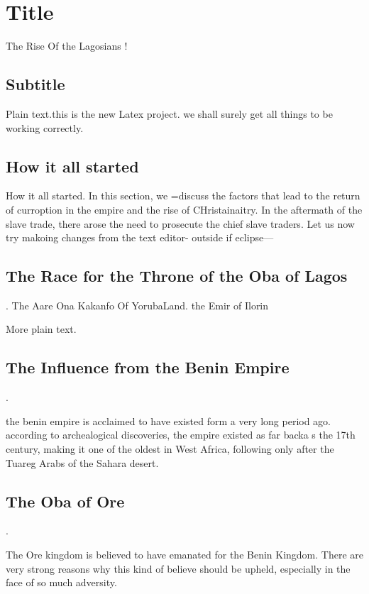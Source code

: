 \documentclass{article}
\begin{document}
\section{Title}The Rise Of the Lagosians !

\subsection{Subtitle}

Plain text.this is the new Latex project. we shall surely get all things to be
working correctly.

\subsection{How it all started}How it all started. In this section, we =discuss
the factors that lead to the return of curroption in the empire and the rise of
CHristainaitry. In the aftermath of the slave trade, there arose the need to
prosecute the chief slave traders.
Let us now try makoing changes from the text editor- outside if eclipse---


\subsection{The Race for the Throne of the Oba of Lagos}. The
Aare Ona Kakanfo Of YorubaLand. the Emir of Ilorin

More plain text.


\subsection{ The Influence from the Benin Empire}.

the benin empire is acclaimed to have existed form a very long period ago. according to archealogical discoveries, the empire existed as far backa s the 17th century, making it one of the oldest in West Africa, following only after the Tuareg Arabs of the Sahara desert.

\subsection{ The Oba of Ore}. 

The Ore kingdom is believed to have emanated for the Benin Kingdom. There are very strong reasons why this kind of believe should be upheld, especially in the face of so much adversity.
\end{document}

